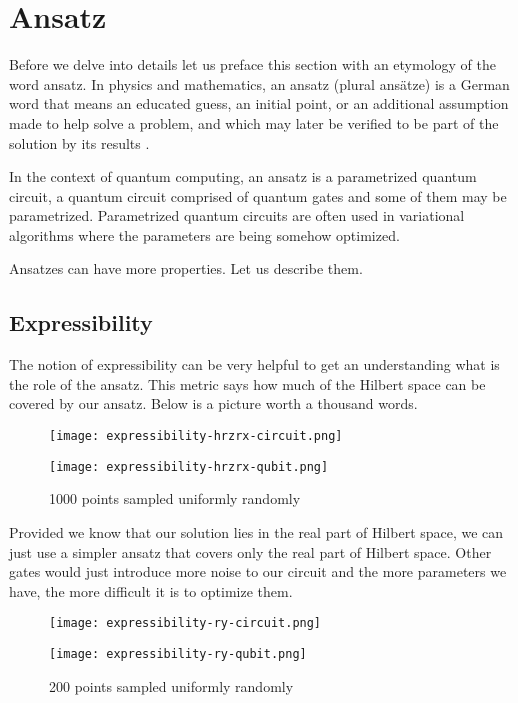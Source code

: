 \chapter{Ansatz}\label{ch:ansatz}
Before we delve into details let us preface this section with an etymology of the word ansatz. In physics and mathematics, an ansatz (plural ansätze) is a German word that means an educated guess, an initial point, or an additional assumption made to help solve a problem, and which may later be verified to be part of the solution by its results \cite{ansatz_etymology}.

In the context of quantum computing, an ansatz is a parametrized quantum circuit,  a quantum circuit comprised of quantum gates and some of them may be parametrized. Parametrized quantum circuits are often used in variational algorithms where the parameters are being somehow optimized.

Ansatzes can have more properties. Let us describe them.

\section{Expressibility}
The notion of expressibility can be very helpful to get an understanding what is the role of the ansatz. This metric says how much of the Hilbert space can be covered by our ansatz. Below is a picture worth a thousand words.

\begin{figure}[H]
        \centering
        \begin{minipage}{0.4\linewidth}
            \centering
            \texttt{[image: expressibility-hrzrx-circuit.png]}
            \vfill
        \end{minipage}
        \hfill
        \begin{minipage}{0.4\linewidth}
            \centering
            \texttt{[image: expressibility-hrzrx-qubit.png]}
            \vfill
        \end{minipage}
        \caption{1000 points sampled uniformly randomly}
\end{figure}

Provided we know that our solution lies in the real part of Hilbert space, we can just use a simpler ansatz that covers only the real part of Hilbert space. Other gates would just introduce more noise to our circuit and the more parameters we have, the more difficult it is to optimize them.

\begin{figure}[H]
    \centering
    \begin{minipage}{0.4\linewidth}
        \centering
        \texttt{[image: expressibility-ry-circuit.png]}
        \vfill
    \end{minipage}
    \hfill
    \begin{minipage}{0.4\linewidth}
        \centering
        \texttt{[image: expressibility-ry-qubit.png]}
        \vfill
    \end{minipage}
    \caption{200 points sampled uniformly randomly}
\end{figure}




